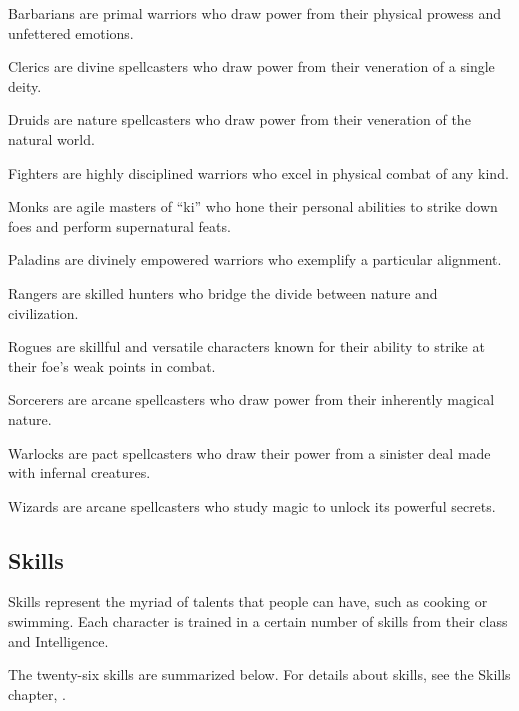         \begin{raggeditemize}
            \item Barbarians are primal warriors who draw power from their physical prowess and unfettered emotions.
            \item Clerics are divine spellcasters who draw power from their veneration of a single deity.
            \item Druids are nature spellcasters who draw power from their veneration of the natural world.
            \item Fighters are highly disciplined warriors who excel in physical combat of any kind.
            \item Monks are agile masters of ``ki'' who hone their personal abilities to strike down foes and perform supernatural feats.
            \item Paladins are divinely empowered warriors who exemplify a particular alignment.
            \item Rangers are skilled hunters who bridge the divide between nature and civilization.
            \item Rogues are skillful and versatile characters known for their ability to strike at their foe's weak points in combat.
            \item Sorcerers are arcane spellcasters who draw power from their inherently magical nature.
            \item Warlocks are pact spellcasters who draw their power from a sinister deal made with infernal creatures.
            \item Wizards are arcane spellcasters who study magic to unlock its powerful secrets.
        \end{raggeditemize}

    \subsection{Skills}
        Skills represent the myriad of talents that people can have, such as cooking or swimming.
        Each character is trained in a certain number of skills from their class and Intelligence.

        The twenty-six skills are summarized below.
        For details about skills, see the Skills chapter, .


